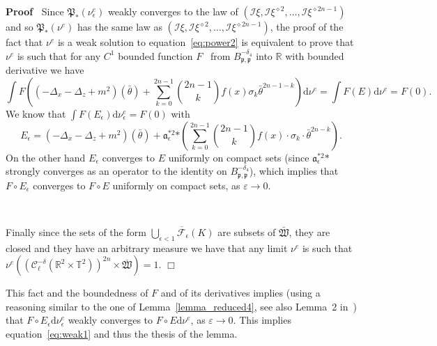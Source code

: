 \documentclass[a4paper,10pt]{article}
\newcommand{\asterisk}{\mathord{*}}
\newcommand{\mathd}{\mathrm{d}}
\newenvironment{proof}{\noindent\textbf{Proof\ }}{\hspace*{\fill}$\Box$\medskip}
\begin{document}
\begin{proof}
  Since $\mathfrak{P}_{\asterisk} (\nu_{\epsilon}^e)$ weakly converges to the
  law of $(\mathcal{I} \xi, \mathcal{I} \xi^{\diamond 2}, \ldots, \mathcal{I}
  \xi^{\diamond 2 n - 1})$ and so $\mathfrak{P}_{\asterisk} (\nu^e)$ has the
  same law as $(\mathcal{I} \xi, \mathcal{I} \xi^{\diamond 2}, \ldots,
  \mathcal{I} \xi^{\diamond 2 n - 1})$, the proof of the fact that $\nu^e$ is
  a weak solution to equation~{\eqref{eq:power2}} is equivalent to prove that
  $\nu^e$ is such that for any $C^1$ bounded function $F$ \ from $B^{-
  \delta_4}_{\mathfrak{p}, \mathfrak{p}}$ into $\mathbb{R}$ with bounded
  derivative we have
  \begin{equation}
    \int F \left( (- \Delta_x - \Delta_z + m^2) (\bar{\theta}) + \mathfrak{}
    \sum_{k = 0}^{2 n - 1} \binom{2 n - 1}{k} f (x) \sigma_k \bar{\theta}^{2 n
    - 1 - k} \right) \mathd \nu^e = \int F (E) \mathd \nu^e = F (0) .
    \label{eq:weak1}
  \end{equation}
  We know that $\int F (E_{\epsilon}) \mathd \nu_{\epsilon}^e = F (0)$ with
  \[ E_{\epsilon} = (- \Delta_x - \Delta_z + m^2) (\bar{\theta}) +
     \mathfrak{a}^{\asterisk 2}_{\epsilon} \asterisk \left( \sum_{k = 0}^{2 n
     - 1} \binom{2 n - 1}{k} f (x) \cdot \sigma_k \cdot \bar{\theta}^{2 n - k}
     \right) . \]
  On the other hand $E_{\epsilon}$ converges to $E$ uniformly on compact sets
  (since $\mathfrak{a}_{\epsilon}^{\asterisk 2} \asterisk$ strongly converges
  as an operator to the identity on $B^{- \delta_4}_{\mathfrak{p},
  \mathfrak{p}}$), which implies that $F \circ E_{\epsilon}$ converges to $F
  \circ E$ uniformly on compact sets, as $\varepsilon \rightarrow 0$.
  
  \
  
  Finally since the sets of the form $\overline{\bigcup_{\epsilon < 1}
  \mathcal{F}_{\epsilon} (K)}$ are subsets of $\mathfrak{\bar{W}}$, they are
  closed and they have an arbitrary measure we have that any limit $\nu^e$ is
  such that $\nu^e ((\mathcal{C}^{- \delta}_{\ell} (\mathbb{R}^2 \times
  \mathbb{T}^2))^{2 n} \times \overline{\mathfrak{W}}) = 1$.
\end{proof}

This fact and the boundedness of $F$ and of its derivatives implies (using a
reasoning similar to the one of Lemma~\ref{lemma_reduced4}, see also Lemma~2
in~{\cite{Albeverio2018elliptic}}) that $F \circ E_{\epsilon} \mathd
\nu_{\epsilon}^e$ weakly converges to $F \circ E \mathd \nu^e$, as
$\varepsilon \rightarrow 0$. This implies equation~{\eqref{eq:weak1}} and thus
the thesis of the lemma.
\end{document}
